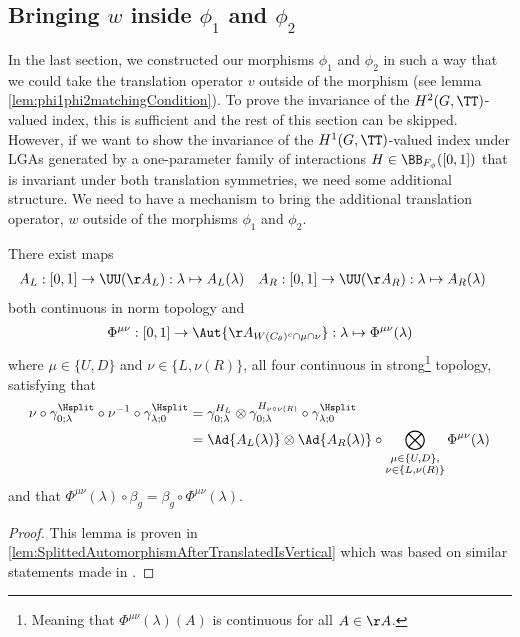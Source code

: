 \subsection{Bringing \texorpdfstring{$w$}{} inside \texorpdfstring{$\phi_1$}{} and \texorpdfstring{$\phi_2$}{}}
In the last section, we constructed our morphisms $\phi_1$ and $\phi_2$ in such a way that we could take the translation operator $v$ outside of the morphism (see lemma \ref{lem:phi1phi2matchingCondition}). To prove the invariance of the $H^2(G,\TT)$-valued index, this is sufficient and the rest of this section can be skipped. However, if we want to show the invariance of the $H^1(G,\TT)$-valued index under LGAs generated by a one-parameter family of interactions $H\in\BB_{F_\phi}([0,1])$ that is invariant under both translation symmetries, we need some additional structure. We need to have a mechanism to bring the additional translation operator, $w$ outside of the morphisms $\phi_1$ and $\phi_2$.
\begin{lemma}\label{lem:TranslatingSplittedTimeEvolution}
	There exist maps
	\begin{align}
		A_L&:[0,1]\rightarrow \UU(\AA_L):\lambda\mapsto A_{L}(\lambda)&A_R&:[0,1]\rightarrow \UU(\AA_R):\lambda\mapsto A_{R}(\lambda)
	\end{align}
	both continuous in norm topology and
	\begin{align}
		\Phi^{\mu\nu}:[0,1]\rightarrow\Aut{\AA_{W(C_\theta)^c\cap\mu\cap\nu}}:\lambda\mapsto \Phi^{\mu\nu}(\lambda)
	\end{align}
	where $\mu\in\{U,D\}$ and $\nu\in\{L,\nu(R)\}$, all four continuous in strong\footnote{Meaning that $\Phi^{\mu\nu}(\lambda)(A)$ is continuous for all $A\in\AA$.} topology, satisfying that
	\begin{align}
		\nu\circ\gamma^{\Hsplit}_{0;\lambda}\circ\nu^{-1}\circ\gamma^{\Hsplit}_{\lambda;0}&=\gamma^{H_L}_{0;\lambda}\otimes\gamma^{H_{\nu\circ\nu(R)}}_{0;\lambda}\circ\gamma^{\Hsplit}_{\lambda;0}\\
		\label{eq:TranslatingSplittedTimeEvolution}
		&=\Ad{A_L(\lambda)}\otimes\Ad{A_R(\lambda)}\circ\bigotimes_{\substack{\mu\in\{U,D\},\\\nu\in\{L,\nu(R)\}}}\Phi^{\mu\nu}(\lambda)
	\end{align}
	and that $\Phi^{\mu\nu}(\lambda)\circ\beta_g=\beta_g\circ\Phi^{\mu\nu}(\lambda)$.
\end{lemma}
\begin{proof}
	This lemma is proven in \ref{lem:SplittedAutomorphismAfterTranslatedIsVertical} which was based on similar statements made in \cite{Ogata2d}.
\end{proof}
